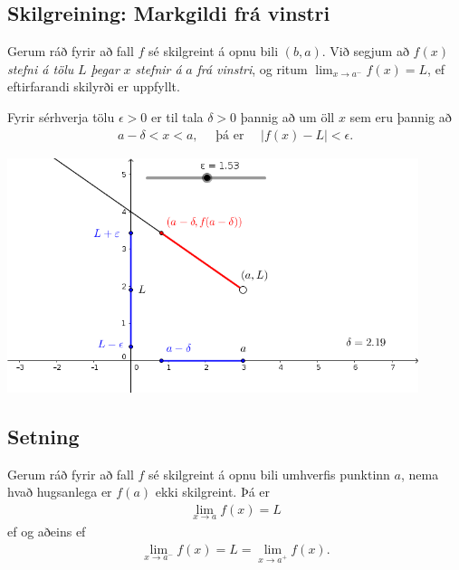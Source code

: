 \documentclass[a4paper,10pt,icelandic]{sphinxmanual}
\begin{document}
\subsection{Skilgreining: Markgildi frá vinstri}
\label{kafli02:skilgreining-markgildi-fra-vinstri}
Gerum ráð fyrir að fall \(f\) sé skilgreint á opnu bili
\((b,a)\). Við segjum að \(f(x)\) \emph{stefni á tölu} \(L\)
\emph{þegar} \(x\) \emph{stefnir á} \(a\) \emph{frá vinstri}, og ritum
\(\lim_{x\rightarrow a^-} f(x)=L\), ef eftirfarandi skilyrði er
uppfyllt.

Fyrir sérhverja tölu \(\epsilon>0\) er til tala \(\delta>0\)
þannig að um öll \(x\) sem eru þannig að
\begin{equation*}
\begin{split}a-\delta<x<a,\quad \text{ þá er } \quad |f(x)-L| <\epsilon.\end{split}
\end{equation*}

\begin{center}
\includegraphics[width=12cm,keepaspectratio=true]{03_markfravinstri.png}
\end{center}



\subsection{Setning}
\label{kafli02:setning-hv-markgildi}\label{kafli02:setning}
Gerum ráð fyrir að fall \(f\) sé skilgreint á opnu bili umhverfis
punktinn \(a\), nema hvað hugsanlega er \(f(a)\) ekki
skilgreint. Þá er
\begin{equation*}
\begin{split}\lim_{x\rightarrow a} f(x)=L\end{split}
\end{equation*}
ef og aðeins ef
\begin{equation*}
\begin{split}\lim_{x\rightarrow a^-} f(x)=L=\lim_{x\rightarrow a^+} f(x).\end{split}
\end{equation*}
\end{document}
